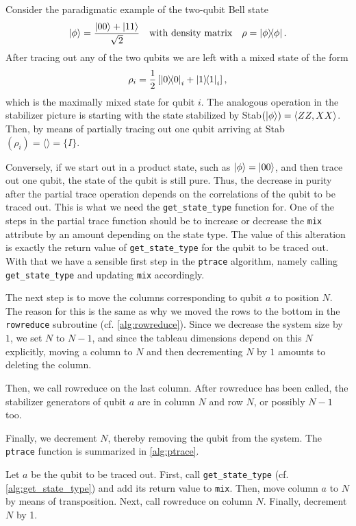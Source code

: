 Consider the paradigmatic example of the two-qubit Bell state
\[
  \ket{\phi} = \frac{\ket{00} + \ket{11}}{\sqrt{2}} \quad{\text{with density
  matrix}} \quad \rho = \dyad{\phi}.
\]
After tracing out any of the two qubits we are left with a mixed state of the
form
$$\rho_i = \frac{1}{2} \left[\dyad{0}_i + \dyad{1}_i\right],$$
which is the maximally mixed state for qubit $i$. The analogous operation in
the stabilizer picture is starting with the state stabilized by
Stab$(\ket{\phi}) = \langle ZZ, XX \rangle$. Then, by means of partially
tracing out one qubit arriving at Stab$(\rho_i) = \langle \rangle = \{ I \}$.

Conversely, if we start out in a product state, such as $\ket{\phi} =
\ket{00}$, and then trace out one qubit, the state of the qubit is still pure.
Thus, the decrease in purity after the partial trace operation depends on the
correlations of the qubit to be traced out. This is what we need the
\verb|get_state_type| function for. One of the steps in the partial trace
function should be to increase or decrease the \verb|mix| attribute by an
amount depending on the state type. The value of this alteration is exactly
the return value of \verb|get_state_type| for the qubit to be traced out. With
that we have a sensible first step in the \verb|ptrace| algorithm, namely
calling \verb|get_state_type| and updating \verb|mix| accordingly.

The next step is to move the columns corresponding to qubit $a$ to position
$N$. The reason for this is the same as why we moved the rows to the bottom
in the \verb|rowreduce| subroutine (cf. \cref{alg:rowreduce}). Since we
decrease the system size by $1$, we set $N$ to $N-1$, and since the tableau
dimensions depend on this $N$ explicitly, moving a column to $N$ and then
decrementing $N$ by $1$ amounts to deleting the column. 

Then, we call rowreduce on the last column. After rowreduce has been called,
the stabilizer generators of qubit $a$ are in column $N$ and row $N$, or
possibly $N-1$ too.

Finally, we decrement $N$, thereby removing the
qubit from the system. The \verb|ptrace| function is summarized in
\cref{alg:ptrace}.
\begin{alg}\label{alg:ptrace}
  Let $a$ be the qubit to be traced out. First, call \verb|get_state_type| (cf.
  \cref{alg:get_state_type}) and add its return value to \verb|mix|. Then, move
  column $a$ to $N$ by means of transposition. Next, call rowreduce on column
  $N$. Finally, decrement $N$ by 1.
\end{alg}
%  

